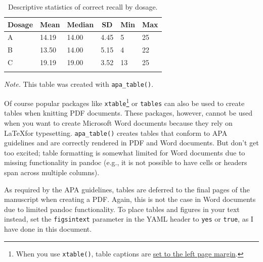 \documentclass[
  man,floatsintext]{apa6}
\begin{document}
\begin{table}[tbp]

\begin{center}
\begin{threeparttable}

\caption{\label{tab:descriptives}Descriptive statistics of correct recall by dosage.}

\begin{tabular}{llllll}
\toprule
Dosage & \multicolumn{1}{c}{Mean} & \multicolumn{1}{c}{Median} & \multicolumn{1}{c}{SD} & \multicolumn{1}{c}{Min} & \multicolumn{1}{c}{Max}\\
\midrule
A & 14.19 & 14.00 & 4.45 & 5 & 25\\
B & 13.50 & 14.00 & 5.15 & 4 & 22\\
C & 19.19 & 19.00 & 3.52 & 13 & 25\\
\bottomrule
\addlinespace
\end{tabular}

\begin{tablenotes}[para]
\normalsize{\textit{Note.} This table was created with \texttt{apa\_table()}.}
\end{tablenotes}

\end{threeparttable}
\end{center}

\end{table}

Of course popular packages like \texttt{xtable}\footnote{When you use \texttt{xtable()}, table captions are \href{http://tex.stackexchange.com/questions/42209/centering-tables-in-document-class-apa6}{set to the left page margin}.} or \texttt{tables} can also be used to create tables when knitting PDF documents.
These packages, however, cannot be used when you want to create Microsoft Word documents because they rely on \LaTeX for typesetting.
\texttt{apa\_table()} creates tables that conform to APA guidelines and are correctly rendered in PDF and Word documents.
But don't get too excited; table formatting is somewhat limited for Word documents due to missing functionality in pandoc (e.g., it is not possible to have cells or headers span across multiple columns).

As required by the APA guidelines, tables are deferred to the final pages of the manuscript when creating a PDF.
Again, this is not the case in Word documents due to limited pandoc functionality.
To place tables and figures in your text instead, set the \texttt{figsintext} parameter in the YAML header to \texttt{yes} or \texttt{true}, as I have done in this document.
\end{document}
